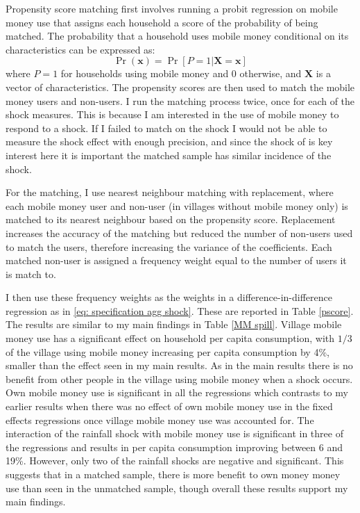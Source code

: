 Propensity score matching first involves running a probit regression on mobile money use that assigns each household a score of the probability of being matched. The probability that a household uses mobile money conditional on its characteristics can be expressed as: 
\begin{equation}
\Pr(\mathbf{x})=\Pr[P=1|\mathbf{X=x}]
\end{equation}
where $P=1$ for households using mobile money and 0 otherwise, and $\mathbf{X}$ is a vector of characteristics. The propensity scores are then used to match the mobile money users and non-users. I run the matching process twice, once for each of the shock measures. This is because I am interested in the use of mobile money to respond to a shock. If I failed to match on the shock I would not be able to measure the shock effect with enough precision, and since the shock of is key interest here it is important the matched sample has similar incidence of the shock. 

For the matching, I use nearest neighbour matching with replacement, where each mobile money user and non-user (in villages without mobile money only) is matched to its nearest neighbour based on the propensity score. Replacement increases the accuracy of the matching but reduced the number of non-users used to match the users, therefore increasing the variance of the coefficients. Each matched non-user is assigned a frequency weight equal to the number of users it is match to. 

I then use these frequency weights as the weights in a difference-in-difference regression as in \eqref{eq: specification agg shock}. These are reported in Table \ref{pscore}. The results are similar to my main findings in Table \ref{MM spill}. Village mobile money use has a significant effect on household per capita consumption, with $1/3$ of the village using mobile money increasing per capita consumption by 4\%, smaller than the effect seen in my main results. As in the main results there is no benefit from other people in the village  using mobile money when a shock occurs. Own mobile money use is significant in all the regressions which contrasts to my earlier results when there was no effect of own mobile money use in the fixed effects regressions once village mobile money use was accounted for. The interaction of the rainfall shock with mobile money use is significant in three of the regressions and results in per capita consumption improving between 6 and 19\%. However, only two of the rainfall shocks are negative and significant. This suggests that in a matched sample, there is more benefit to own money money use than seen in the unmatched sample, though overall these results support my main findings. 


